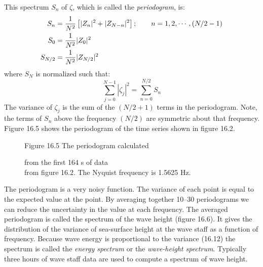 This spectrum $S_{n}$ of $\zeta $, which is called the
\textit{periodogram},
is:
\begin{align}
S_{n} &= \frac{1}{N^{2}} \left[ |Z_{n}|^{2} + |Z_{N-n}|^{2} \right] ; \qquad n =
1, 2, \cdots , ( N/2 - 1 ) \\
 S_{0} &= \frac{1}{N^{2}} |Z_{0}|^{2} \notag \\
S_{N/2} &= \frac{1}{N^{2}} |Z_{N/2}|^{2} \notag
\end{align}
where $ S_{N} $ is normalized such that:
\begin{equation}
\sum_{j=0}^{N-1} |\zeta_{j}|^2 = \sum_{n=0}^{N/2} S_{n}
\end{equation}
The variance of $\zeta_{j}$ is the sum of the $(N/2 + 1)$ terms in the
periodogram. Note, the terms of $S_{n}$ above the frequency $(N/2)$
are symmetric about that frequency. Figure 16.5 shows the periodogram
of the time series shown in figure 16.2.

\begin{figure}[t!]
\footnotesize
\centering
Figure 16.5 The periodogram calculated \rule{0mm}{3ex}from the first
164 s of data\\from figure 16.2. The Nyquist frequency is 1.5625 Hz.
\label{fig:periodogram}
\vspace{-3ex}
\end{figure}

The periodogram is a very noisy function. The variance of each point
is equal to the expected value at the point. By averaging together
10--30 periodograms we can reduce the uncertainty in the value at each
frequency. The averaged periodogram is called the spectrum of the wave
height (figure 16.6). It gives the distribution of the variance of
sea-surface height at the wave staff as a function of
frequency. Because wave energy is proportional to the variance (16.12)
the spectrum is called the \textit{energy
  spectrum} or the
\textit{wave-height
  spectrum}. Typically three
hours of wave staff data are used to compute a spectrum of wave
height.

